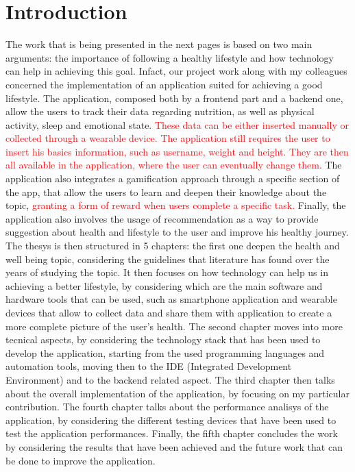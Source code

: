 \section*{Introduction}
The work that is being presented in the next pages is based on two main arguments: the importance of following a healthy lifestyle and how technology can help in achieving this goal. Infact, our project work along with my colleagues concerned the implementation of an application suited for achieving a good lifestyle. The application, composed both by a frontend part and a backend one, allow the users to track their data regarding nutrition, as well as physical activity, sleep and emotional state. \textcolor{red}{These data can be either inserted manually or collected through a wearable device. The application still requires the user to insert his basics information, such as username, weight and height. They are then all available in the application, where the user can eventually change them}. The application also integrates a gamification approach through a specific section of the app, that allow the users to learn and deepen their knowledge about the topic, \textcolor{red}{granting a form of reward when users complete a specific task.} Finally, the application also involves the usage of recommendation as a way to provide suggestion about health and lifestyle to the user and improve his healthy journey. The thesys is then structured in 5 chapters: the first one deepen the health and well being topic, considering the guidelines that literature has found over the years of studying the topic. It then focuses on how technology can help us in achieving a better lifestyle, by considering which are the main software and hardware tools that can be used, such as smartphone application and wearable devices that allow to collect data and share them with application to create a more complete picture of the user's health. The second chapter moves into more tecnical aspects, by considering the technology stack that has been used to develop the application, starting from the used programming languages and automation tools, moving then to the IDE (Integrated Development Environment) and to the backend related aspect. The third chapter then talks about the overall implementation of the application, by focusing on my particular contribution. The fourth chapter talks about the performance analisys of the application, by considering the different testing devices that have been used to test the application performances. Finally, the fifth chapter concludes the work by considering the results that have been achieved and the future work that can be done to improve the application.
\newpage